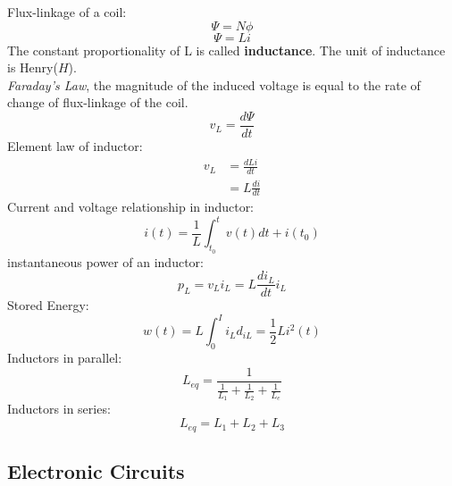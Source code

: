 \documentclass{article}
\begin{document}
\begin{enumerate}
Flux-linkage of a coil:
\[\Psi = N\phi\]
\[\Psi = Li\]
The constant proportionality of L is called \textbf{inductance}. The unit of inductance is Henry($H$). \\
\textit{Faraday's Law}, the magnitude of the induced voltage is equal to the rate of change of flux-linkage of the coil.
\[v_L=\frac{d\Psi}{dt}\]
Element law of inductor:
\begin{align*}
v_L &= \frac{dLi}{dt}\\
    &= L\frac{di}{dt}
\end{align*}
Current and voltage relationship in inductor:
\[i(t)=\frac{1}{L}\int^t_{t_0}v(t)dt+i(t_0)\]
instantaneous power of an inductor:
\[p_L =v_Li_L =L\frac{di_L}{dt}i_L\]
Stored Energy:
\[w(t)=L\int^{I}_{0}i_Ld_{iL} = \frac{1}{2}Li^2(t)\]
Inductors in parallel:
\[L_{eq}=\frac{1}{\frac{1}{L_1}+\frac{1}{L_2}+\frac{1}{L_e}}\]
Inductors in series:
\[L_{eq}=L_1+L_2+L_3\]
\end{enumerate}

\newpage
\subsection{Electronic Circuits}
\end{document}
